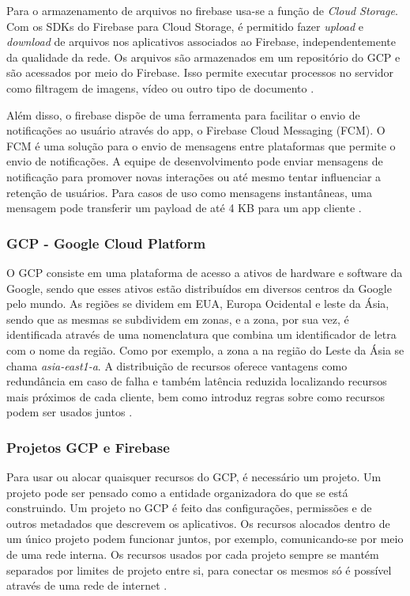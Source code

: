 Para o armazenamento de arquivos no firebase usa-se a função de \textit{Cloud Storage}. Com os SDKs do Firebase para Cloud Storage, é permitido fazer \textit{upload} e \textit{download} de arquivos nos aplicativos associados ao Firebase, independentemente da qualidade da rede. Os arquivos são armazenados em um repositório do GCP e são acessados por meio do Firebase. Isso permite executar processos no servidor como filtragem de imagens, vídeo ou outro tipo de documento \citep{firebase_docs}. 

Além disso, o firebase dispõe de uma ferramenta para facilitar o envio de notificações ao usuário através do app, o Firebase Cloud Messaging (FCM). O FCM é uma solução para o envio de mensagens entre plataformas que permite o envio de notificações. A equipe de desenvolvimento pode enviar mensagens de notificação para promover novas interações ou até mesmo tentar influenciar a retenção de usuários. Para casos de uso como mensagens instantâneas, uma mensagem pode transferir um payload de até 4 KB para um app cliente \citep{firebase_docs}.

\subsubsection{GCP - Google Cloud Platform}
O GCP consiste em uma plataforma de acesso a ativos de hardware e software da Google, sendo que esses ativos estão distribuídos em diversos centros da Google pelo mundo. As regiões se dividem em EUA, Europa Ocidental e leste da Ásia, sendo que as mesmas se subdividem em zonas, e a zona, por sua vez, é identificada através de uma nomenclatura que combina um identificador de letra com o nome da região. Como por exemplo, a zona a na região do Leste da Ásia se chama \textit{asia-east1-a}. A distribuição de recursos oferece  vantagens como redundância em caso de falha e também latência reduzida localizando recursos mais próximos de cada cliente, bem como introduz regras sobre como recursos podem ser usados juntos \citep{gcp_2019} .

\subsubsection{Projetos GCP e Firebase}
Para usar ou alocar quaisquer recursos do GCP, é necessário um projeto. Um projeto pode ser pensado como a entidade organizadora do que se está construindo. Um projeto no GCP é feito das configurações, permissões e de outros metadados que descrevem os aplicativos. Os recursos alocados dentro de um único projeto podem funcionar juntos, por exemplo, comunicando-se por meio de uma rede interna. Os recursos usados por cada projeto sempre se mantém separados por limites de projeto entre si, para conectar os mesmos só é possível através de uma rede de internet \citep{gcp_2019}.

